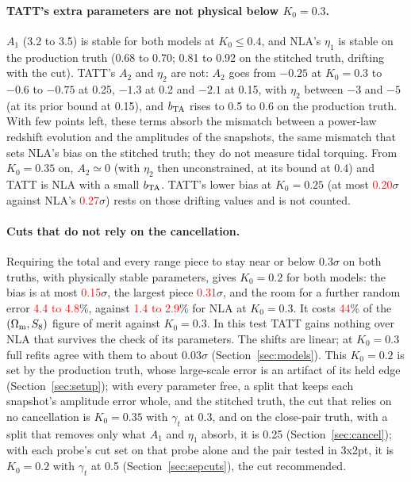 \documentclass[11pt]{article}
\newcommand{\Om}{\Omega_{\rm m}}
\newif\ifnumbersfinal
\newcommand{\refresh}[1]{\ifnumbersfinal#1\else\textcolor{red}{#1}\fi}
\newcommand{\CutNLASOneQuarter}{\refresh{0.27}}
\newcommand{\CutIINLATwo}{\refresh{0.31}}
\newcommand{\CutNLAMaxRobust}{\refresh{0.15}}
\newcommand{\CutTATTMaxRobust}{\refresh{0.20}}
\newcommand{\CutRoomNLATwo}{\refresh{4.4 to 4.8}}
\newcommand{\CutRoomNLAThree}{\refresh{1.4 to 2.9}}
\newcommand{\CutFoMNLA}{\refresh{44}}
\newcommand{\Tol}{0.3}
\begin{document}
\paragraph{TATT's extra parameters are not physical below $K_0 = 0.3$.}
$A_1$ (3.2 to 3.5) is stable for both models at $K_0 \le 0.4$, and NLA's
$\eta_1$ is stable on the production truth (0.68 to 0.70; 0.81 to 0.92 on
the stitched truth, drifting with the cut). TATT's $A_2$ and $\eta_2$ are
not: $A_2$ goes from $-0.25$ at $K_0 = 0.3$ to $-0.6$ to $-0.75$ at 0.25,
$-1.3$ at 0.2 and $-2.1$ at 0.15, with $\eta_2$ between $-3$ and $-5$
(at its prior bound at 0.15), and $b_{\rm TA}$ rises to 0.5 to 0.6 on the
production truth. With few points left, these terms absorb the mismatch
between a power-law redshift evolution and the amplitudes of the snapshots,
the same mismatch that sets NLA's bias on the stitched truth; they do not
measure tidal torquing. From $K_0 = 0.35$ on, $A_2 \simeq 0$ (with
$\eta_2$ then unconstrained, at its bound at 0.4) and TATT is NLA with a
small $b_{\rm TA}$. TATT's lower bias at $K_0 = 0.25$ (at most
\CutTATTMaxRobust$\sigma$ against NLA's \CutNLASOneQuarter$\sigma$) rests on those
drifting values and is not counted.

\paragraph{Cuts that do not rely on the cancellation.}
Requiring the total and every range piece to stay near or below
\Tol$\sigma$ on both truths, with physically stable parameters, gives
$K_0 = 0.2$ for both models: the bias is at most \CutNLAMaxRobust$\sigma$,
the largest piece \CutIINLATwo$\sigma$, and the room for a further random
error \CutRoomNLATwo\%, against \CutRoomNLAThree\% for NLA at $K_0 =
0.3$. It costs \CutFoMNLA\% of the $(\Om, S_8)$ figure of merit against
$K_0 = 0.3$. In this test TATT gains nothing over NLA that survives the
check of its parameters. The shifts are linear; at $K_0 = 0.3$ full refits
agree with them to about $0.03\sigma$ (Section~\ref{sec:models}). This
$K_0 = 0.2$ is set by the production truth, whose large-scale error is an
artifact of its held edge (Section~\ref{sec:setup}); with every parameter
free, a split that keeps each snapshot's amplitude error whole, and the
stitched truth, the cut that relies on no cancellation is $K_0 = 0.35$
with $\gamma_t$ at 0.3, and on the close-pair truth, with a split that
removes only what $A_1$ and $\eta_1$ absorb, it is 0.25
(Section~\ref{sec:cancel}); with each probe's cut set
on that probe alone and the pair tested in 3x2pt, it is $K_0 = 0.2$ with
$\gamma_t$ at 0.5 (Section~\ref{sec:sepcuts}), the cut recommended.
\end{document}
